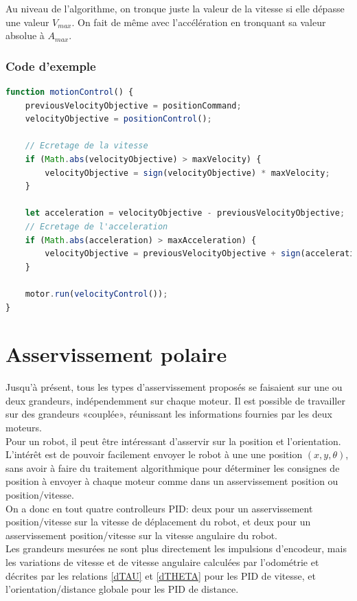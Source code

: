         \newpage

        Au niveau de l'algorithme, on tronque juste la valeur de la vitesse si elle dépasse une valeur $V_{max}$. On fait de même avec l'accélération en tronquant sa valeur absolue à $A_{max}$.
        \subsubsection{Code d'exemple}
            \begin{lstlisting}[language=JavaScript]
function motionControl() {
    previousVelocityObjective = positionCommand;
    velocityObjective = positionControl();

    // Ecretage de la vitesse
    if (Math.abs(velocityObjective) > maxVelocity) {
        velocityObjective = sign(velocityObjective) * maxVelocity;
    }

    let acceleration = velocityObjective - previousVelocityObjective;
    // Ecretage de l'acceleration
    if (Math.abs(acceleration) > maxAcceleration) {
        velocityObjective = previousVelocityObjective + sign(acceleration) * maxAcceleration;
    }

    motor.run(velocityControl());
}
            \end{lstlisting}

    \newpage
    \section{Asservissement polaire}
        Jusqu'à présent, tous les types d'asservissement proposés se faisaient sur une ou deux grandeurs, indépendemment sur chaque moteur. Il est possible de travailler sur des grandeurs «couplée», réunissant les informations fournies par les deux moteurs.\\

        Pour un robot, il peut être intéressant d'asservir sur la position et l'orientation. L'intérêt est de pouvoir facilement envoyer le robot à une une position $(x, y, \theta)$, sans avoir à faire du traitement algorithmique pour déterminer les consignes de position à envoyer à chaque moteur comme dans un asservissement position ou position/vitesse.\\
        On a donc en tout quatre controlleurs PID: deux pour un asservissement position/vitesse sur la vitesse de déplacement du robot, et deux pour un asservissement position/vitesse sur la vitesse angulaire du robot.\\
        Les grandeurs mesurées ne sont plus directement les impulsions d'encodeur, mais les variations de vitesse et de vitesse angulaire calculées par l'odométrie et décrites par les relations \eqref{dTAU} et \eqref{dTHETA} pour les PID de vitesse, et l'orientation/distance globale pour les PID de distance.

